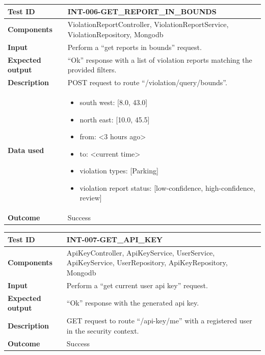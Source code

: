 \begin{table}[H]
    \centering
    \begin{tabular}{p{3cm}p{10cm}}
    \textbf{Test ID} & INT-006-GET\_REPORT\_IN\_BOUNDS \\ \hline
    \textbf{Components} & ViolationReportController, ViolationReportService, ViolationRepository, Mongodb \\ \hline
    \textbf{Input} & Perform a “get reports in bounds” request. \\ \hline
    \textbf{Expected output} & “Ok” response with a list of violation reports matching the provided filters. \\ \hline
    \textbf{Description} & POST request to route “/violation/query/bounds”. \\ \hline
    \textbf{Data used} & 
        \begin{itemize}[label={}] \itemsep0em
            \item south west: [8.0, 43.0]
            \item north east: [10.0, 45.5]
            \item from: <3 hours ago>
            \item to: <current time>
            \item violation types: [Parking]
            \item violation report status: [low-confidence, high-confidence, review]
        \end{itemize} \\ \hline
    \textbf{Outcome} & Success \\ \hline
    \end{tabular}
\end{table}

\begin{table}[H]
    \centering
    \begin{tabular}{p{3cm}p{10cm}}
    \textbf{Test ID} & INT-007-GET\_API\_KEY \\ \hline
    \textbf{Components} & ApiKeyController, ApiKeyService, UserService, ApiKeyService, UserRepository, ApiKeyRepository, Mongodb \\ \hline
    \textbf{Input} & Perform a “get current user api key” request. \\ \hline
    \textbf{Expected output} & “Ok” response with the generated api key. \\ \hline
    \textbf{Description} & GET request to route “/api-key/me” with a registered user in the security context. \\ \hline
    \textbf{Outcome} & Success \\ \hline
    \end{tabular}
\end{table}

